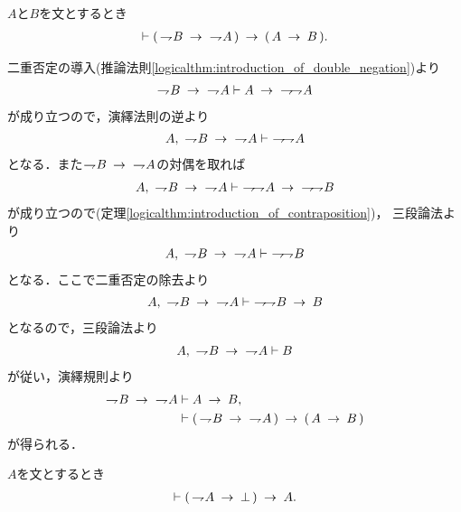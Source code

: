 	\begin{screen}
		\begin{logicalthm}[対偶論法の原理]
		\label{logicalthm:proof_by_contraposition}
			$A$と$B$を文とするとき
			\begin{align}
				\vdash (\, \negation B \rarrow\ \negation A\, )
				\rarrow (\, A \rarrow B\, ).
			\end{align}
		\end{logicalthm}
	\end{screen}
	
	\begin{prf}
		二重否定の導入(推論法則\ref{logicalthm:introduction_of_double_negation})より
		\begin{align}
			\negation B \rarrow\ \negation A \vdash 
			A \rarrow\ \negation \negation A
		\end{align}
		が成り立つので，演繹法則の逆より
		\begin{align}
			A,\ \negation B \rarrow\ \negation A \vdash\ \negation \negation A
		\end{align}
		となる．また$\negation B \rarrow\ \negation A$の対偶を取れば
		\begin{align}
			A,\ \negation B \rarrow\ \negation A \vdash\ 
			\negation \negation A \rarrow\ \negation \negation B
		\end{align}
		が成り立つので(定理\ref{logicalthm:introduction_of_contraposition})，
		三段論法より
		\begin{align}
			A,\ \negation B \rarrow\ \negation A \vdash\ \negation \negation B
		\end{align}
		となる．ここで二重否定の除去より
		\begin{align}
			A,\ \negation B \rarrow\ \negation A \vdash\ 
			\negation \negation B \rarrow B
		\end{align}
		となるので，三段論法より
		\begin{align}
			A,\ \negation B \rarrow\ \negation A \vdash B
		\end{align}
		が従い，演繹規則より
		\begin{align}
			\negation B \rarrow\ \negation A &\vdash A \rarrow B, \\
			&\vdash (\, \negation B \rarrow\ \negation A\, ) 
			\rarrow (\, A \rarrow B\, )
		\end{align}
		が得られる．
		\QED
	\end{prf}
	
	\begin{screen}
		\begin{logicalthm}[背理法の原理]
		\label{logicalthm:proof_by_contradiction}
			$A$を文とするとき
			\begin{align}
				\vdash (\, \negation A \rarrow \bot\, ) \rarrow A.
			\end{align}
		\end{logicalthm}
	\end{screen}
	
